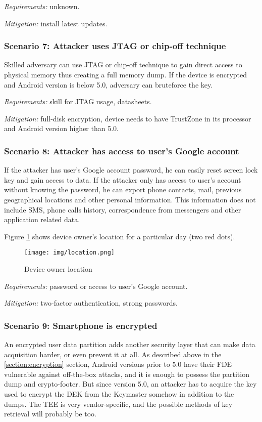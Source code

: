 \textsl{Requirements:} unknown.

\textsl{Mitigation:} install latest updates.

\subsubsection{Scenario 7: Attacker uses JTAG or chip-off technique}

Skilled adversary can use JTAG or chip-off technique to gain direct access to physical memory thus creating a full memory dump. If the device is encrypted and Android version is below 5.0, adversary can bruteforce the key.


\textsl{Requirements:} skill for JTAG usage, datasheets.

\textsl{Mitigation:} full-disk encryption, device needs to have TrustZone in its processor and Android version higher than 5.0.


\subsubsection{Scenario 8: Attacker has access to user’s Google account}

If the attacker has user’s Google account password, he can easily reset screen lock key and gain access to data. If the attacker only has access to user’s account without knowing the password, he can export phone contacts, mail, previous geographical locations and other personal information. This information does not include SMS, phone calls history,  correspondence from messengers and other application related data.

Figure \ref{pic:location} shows device owner’s location for a particular day (two red dots).

\begin{figure}[!ht]
\centering
\texttt{[image: img/location.png]}
\caption{Device owner location}
\label{pic:location}
\end{figure}

\textsl{Requirements:} password or access to user’s Google account.

\textsl{Mitigation:} two-factor authentication, strong passwords.


\subsubsection{Scenario 9: Smartphone is encrypted}

An encrypted user data partition adds another security layer that can make data acquisition harder, or even prevent it at all. As described above in the \ref{section:encryption} section, Android versions prior to 5.0 have their FDE vulnerable against off-the-box attacks, and it is enough to possess the partition dump and crypto-footer. But since version 5.0, an attacker has to acquire the key used to encrypt the DEK from the Keymaster somehow in addition to the dumps. The TEE is very vendor-specific, and the possible methods of key retrieval will probably be too. 

